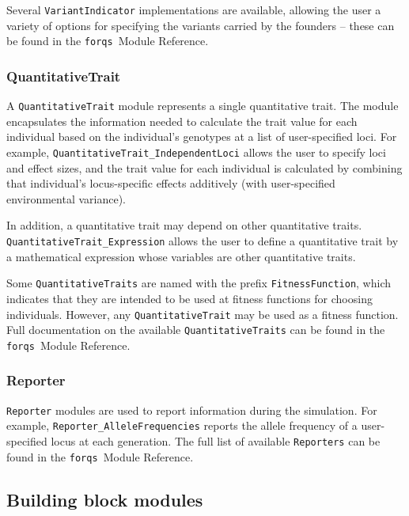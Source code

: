 \documentclass{article}
\newcommand{\forqs}[0]{\texttt{forqs }}
\begin{document}
Several \texttt{VariantIndicator} implementations are available, allowing the
user a variety of options for specifying the variants carried by the founders
-- these can be found in the \forqs Module Reference.


\subsubsection{QuantitativeTrait}

A \texttt{QuantitativeTrait} module represents a single quantitative trait.
The module encapsulates the information needed to calculate the trait value for
each individual based on the individual's genotypes at a list of user-specified
loci.  For example, \texttt{QuantitativeTrait\_IndependentLoci} allows the user
to specify loci and effect sizes, and the trait value for each individual is
calculated by combining that individual's locus-specific effects additively
(with user-specified environmental variance).

In addition, a quantitative trait may depend on other quantitative traits.
\texttt{QuantitativeTrait\_Expression} allows the user to define a quantitative
trait by a mathematical expression whose variables are other quantitative
traits.

Some \texttt{QuantitativeTraits} are named with the prefix
\texttt{FitnessFunction}, which indicates that they are intended to be used at
fitness functions for choosing individuals.  However, any
\texttt{QuantitativeTrait} may be used as a fitness function.  Full
documentation on the available \texttt{QuantitativeTraits} can be found in the
\forqs Module Reference.


\subsubsection{Reporter}

\texttt{Reporter} modules are used to report information during the simulation.
For example, \texttt{Reporter\_AlleleFrequencies} reports the allele frequency
of a user-specified locus at each generation.  The full list of available
\texttt{Reporters} can be found in the \forqs Module Reference.




\subsection{Building block modules}
\label{subsection_building_block_modules}
\end{document}
